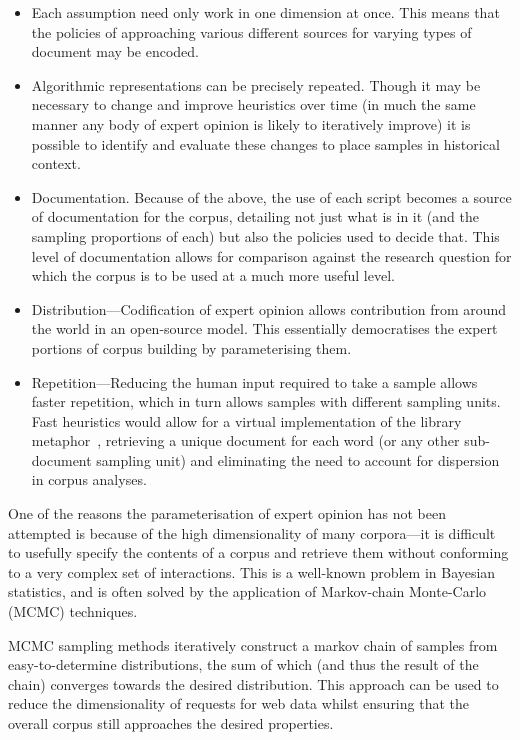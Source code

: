 \begin{itemize}
    \item Each assumption need only work in one dimension at once.  This means that the policies of approaching various different sources for varying types of document may be encoded.
    \item Algorithmic representations can be precisely repeated.  Though it may be necessary to change and improve heuristics over time (in much the same manner any body of expert opinion is likely to iteratively improve) it is possible to identify and evaluate these changes to place samples in historical context.
    \item Documentation.  Because of the above, the use of each script becomes a source of documentation for the corpus, detailing not just what is in it (and the sampling proportions of each) but also the policies used to decide that.  This level of documentation allows for comparison against the research question for which the corpus is to be used at a much more useful level.
    \item Distribution---Codification of expert opinion allows contribution from around the world in an open-source model.  This essentially democratises the expert portions of corpus building by parameterising them.
    \item Repetition---Reducing the human input required to take a sample allows faster repetition, which in turn allows samples with different sampling units.  Fast heuristics would allow for a virtual implementation of the library metaphor~\cite{evert2006random}, retrieving a unique document for each word (or any other sub-document sampling unit) and eliminating the need to account for dispersion in corpus analyses.
\end{itemize}


One of the reasons the parameterisation of expert opinion has not been attempted is because of the high dimensionality of many corpora---it is difficult to usefully specify the contents of a corpus and retrieve them without conforming to a very complex set of interactions.  This is a well-known problem in Bayesian statistics, and is often solved by the application of Markov-chain Monte-Carlo (MCMC) techniques.

MCMC sampling methods iteratively construct a markov chain of samples from easy-to-determine distributions, the sum of which (and thus the result of the chain) converges towards the desired distribution.  This approach can be used to reduce the dimensionality of requests for web data whilst ensuring that the overall corpus still approaches the desired properties.
     
